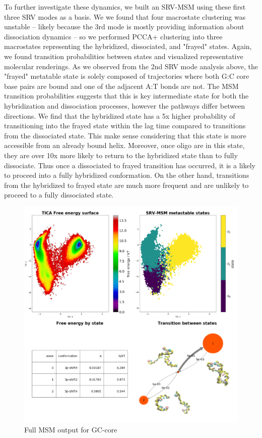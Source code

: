 \documentclass[journal=jpcbfk,manuscript=article]{achemso}
\begin{document}
To further investigate these dynamics, we built an SRV-MSM using these first three SRV modes as a basis. We we found that four macrostate clustering was unstable -- likely because the 3rd mode is mostly providing  information about dissociation dynamics -- so we performed PCCA+ clustering into three macrostates representing the hybridized, dissociated, and "frayed" states. Again, we found transition probabilities between states and visualized representative molecular renderings. As we observed from the 2nd SRV mode analysis above, the "frayed" metatable state is solely composed of trajectories where both G:C core base pairs are bound and one of the adjacent A:T bonds are not. The MSM transition probabilities suggests that this is key intermediate state for both the hybridization and dissociation processes, however the pathways differ between directions. We find that the hybridized state has a 5x higher probability of transitioning into the frayed state within the lag time compared to transitions from the dissociated state. This make sense considering that this state is more accessible from an already bound helix. Moreover, once oligo are in this state, they are over 10x more likely to return to the hybridized state than to fully dissociate. Thus once a dissociated to frayed transition has occurred, it is a likely to proceed into a fully hybridized conformation. On the other hand, transitions from the hybridized to frayed state are much more frequent and are unlikely to proceed to a fully dissociated state.

\begin{figure}[ht!]
	\begin{center}
        \includegraphics[width=\textwidth]{Figs/figs_0804/GC-core_thermo.PNG}
        \caption{Full MSM output for GC-core}
        \label{fig:GC-core_thermo}
	\end{center}
\end{figure}
\end{document}
